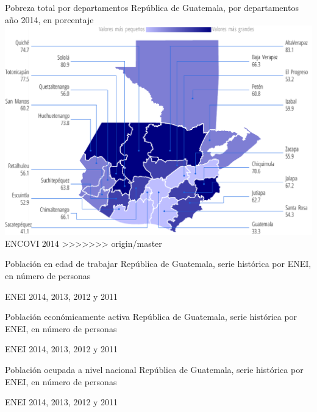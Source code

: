                     {%
                    }%
                    {%
                    	Pobreza total  por departamentos
                    } %
                    {%
                    	República de Guatemala, por departamentos año 2014, en porcentaje} %
                    {%
                    	\includegraphics[width=52\cuadri]{graficas/1_19.pdf}}%
                    {%
                    	ENCOVI 2014} %
>>>>>>> origin/master
         
 
 {%
 }%
 {%
 	Población en edad de trabajar} %
 {%
 	República de Guatemala, serie histórica por ENEI, en número de personas} %
 {%
 	\begin{tikzpicture}[x=1pt,y=1pt]    \end{tikzpicture}}%
 {%
 	ENEI 2014, 2013, 2012 y 2011} %
 
 
 
 {%
 }%
 {%
 	Población económicamente activa} %
 {%
 	República de Guatemala, serie histórica por ENEI, en número de personas} %
 {%
 	\begin{tikzpicture}[x=1pt,y=1pt]    \end{tikzpicture}}%
 {%
 	ENEI 2014, 2013, 2012 y 2011} %
 
 
  
  {%
  }%
  {%
  	Población ocupada a nivel nacional} %
  {%
  	República de Guatemala, serie histórica por ENEI, en número de personas} %
  {%
  	\begin{tikzpicture}[x=1pt,y=1pt]    \end{tikzpicture}}%
  {%
  	ENEI 2014, 2013, 2012 y 2011} %
  
